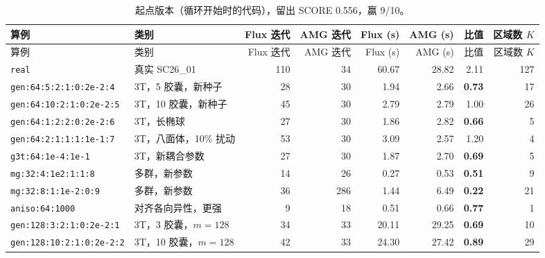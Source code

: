 {\footnotesize\setlength{\tabcolsep}{4pt}
\begin{longtable}{llrrrrrr}
\caption{起点版本（循环开始时的代码），留出 SCORE 0.556，赢 9/10。}\\
\toprule
算例 & 类别 & Flux 迭代 & AMG 迭代 & Flux (s) & AMG (s) & 比值 & 区域数 $K$ \\
\midrule
\endfirsthead
\toprule
算例 & 类别 & Flux 迭代 & AMG 迭代 & Flux (s) & AMG (s) & 比值 & 区域数 $K$ \\
\midrule
\endhead
\bottomrule
\endlastfoot
\texttt{real} & 真实 SC26\_01 & 110 & 34 & 60.67 & 28.82 & 2.11 & 127 \\
\texttt{gen:64:5:2:1:0:2e-2:4} & 3T，5 胶囊，新种子 & 28 & 30 & 1.94 & 2.66 & \textbf{0.73} & 17 \\
\texttt{gen:64:10:2:1:0:2e-2:5} & 3T，10 胶囊，新种子 & 45 & 30 & 2.79 & 2.79 & 1.00 & 26 \\
\texttt{gen:64:1:2:2:0:2e-2:6} & 3T，长椭球 & 27 & 30 & 1.86 & 2.82 & \textbf{0.66} & 5 \\
\texttt{gen:64:2:1:1:1:1e-1:7} & 3T，八面体，10\% 扰动 & 53 & 30 & 3.09 & 2.57 & 1.20 & 4 \\
\texttt{g3t:64:1e-4:1e-1} & 3T，新耦合参数 & 27 & 30 & 1.87 & 2.70 & \textbf{0.69} & 5 \\
\texttt{mg:32:4:1e2:1:1:8} & 多群，新参数 & 14 & 26 & 0.27 & 0.53 & \textbf{0.51} & 9 \\
\texttt{mg:32:8:1:1e-2:0:9} & 多群，新参数 & 36 & 286 & 1.44 & 6.49 & \textbf{0.22} & 21 \\
\texttt{aniso:64:1000} & 对齐各向异性，更强 & 9 & 18 & 0.51 & 0.66 & \textbf{0.77} & 1 \\
\texttt{gen:128:3:2:1:0:2e-2:1} & 3T，3 胶囊，$m=128$ & 34 & 33 & 20.11 & 29.25 & \textbf{0.69} & 10 \\
\texttt{gen:128:10:2:1:0:2e-2:2} & 3T，10 胶囊，$m=128$ & 42 & 33 & 24.30 & 27.42 & \textbf{0.89} & 29 \\
\end{longtable}}

